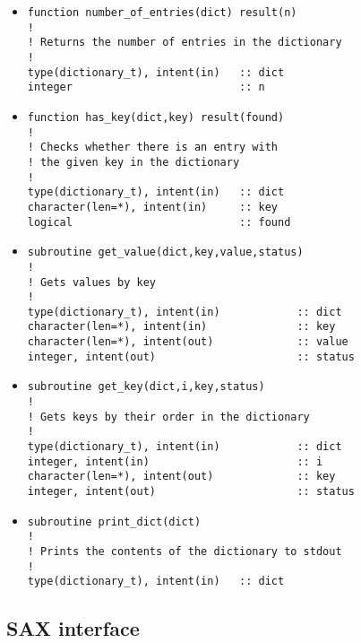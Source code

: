 \documentclass[11pt]{article}
\begin{document}
\begin{itemize}
\item
%
\begin{verbatim}
function number_of_entries(dict) result(n)
!
! Returns the number of entries in the dictionary
!
type(dictionary_t), intent(in)   :: dict
integer                          :: n
\end{verbatim}
%
\item
%
\begin{verbatim}
function has_key(dict,key) result(found)
!
! Checks whether there is an entry with
! the given key in the dictionary
!
type(dictionary_t), intent(in)   :: dict
character(len=*), intent(in)     :: key
logical                          :: found
\end{verbatim}
\item
%
\begin{verbatim}
subroutine get_value(dict,key,value,status)
!
! Gets values by key
!
type(dictionary_t), intent(in)            :: dict
character(len=*), intent(in)              :: key
character(len=*), intent(out)             :: value
integer, intent(out)                      :: status
\end{verbatim}
%
\item
%
\begin{verbatim}
subroutine get_key(dict,i,key,status)
!
! Gets keys by their order in the dictionary
!
type(dictionary_t), intent(in)            :: dict
integer, intent(in)                       :: i
character(len=*), intent(out)             :: key
integer, intent(out)                      :: status

\end{verbatim}
%
\item
%
\begin{verbatim}
subroutine print_dict(dict)
!
! Prints the contents of the dictionary to stdout
!
type(dictionary_t), intent(in)   :: dict
\end{verbatim}
\end{itemize}

\subsection{SAX interface}
\end{document}
